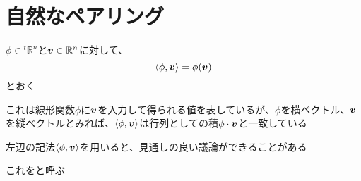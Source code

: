 \documentclass[../../../topic_linear-algebra]{subfiles}
\begin{document}
\sectionline
\section{自然なペアリング}

$\phi \in {}^t\mathbb{R}^n$と$\vb*{v} \in \mathbb{R}^n$に対して、
\begin{equation*}
  \langle \phi, \vb*{v} \rangle = \phi(\vb*{v})
\end{equation*}
とおく

\br

これは線形関数$\phi$に$\vb*{v}$を入力して得られる値を表しているが、$\phi$を横ベクトル、$\vb*{v}$を縦ベクトルとみれば、$\langle \phi, \vb*{v} \rangle$は行列としての積$\phi \cdot \vb*{v}$と一致している

\br

左辺の記法$\langle \phi, \vb*{v} \rangle$を用いると、見通しの良い議論ができることがある

これをと呼ぶ
\end{document}

